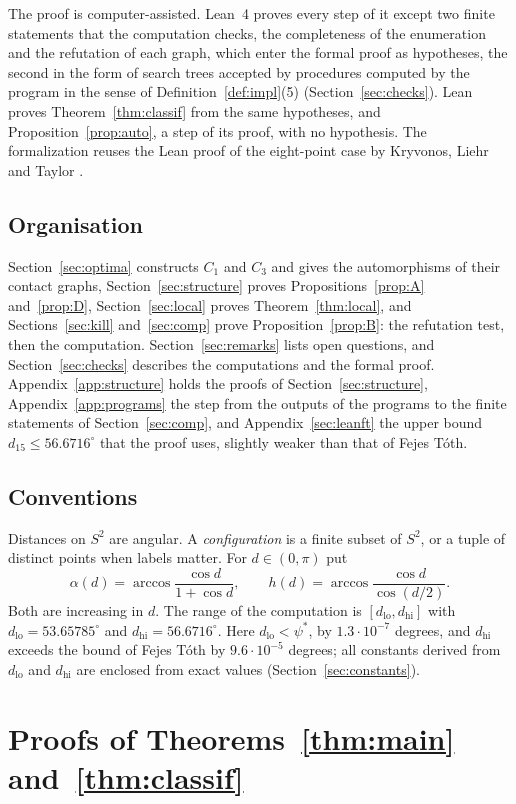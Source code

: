\documentclass[12pt]{amsart}
\theoremstyle{definition}
\theoremstyle{plain}
\theoremstyle{definition}
\newcommand{\Sph}{S^2}
\newcommand{\psis}{\psi^{*}}
\newcommand{\dlo}{d_{\mathrm{lo}}}
\newcommand{\dhi}{d_{\mathrm{hi}}}
\newcommand{\CI}{C_1}
\newcommand{\CIII}{C_3}
\begin{document}
The proof is computer-assisted. Lean~4 proves every step of it except two finite statements that the computation checks, the completeness of the enumeration and the refutation of each graph, which enter the formal proof as hypotheses, the second in the form of search trees accepted by procedures computed by the program in the sense of Definition~\ref{def:impl}(5) (Section~\ref{sec:checks}). Lean proves Theorem~\ref{thm:classif} from the same hypotheses, and Proposition~\ref{prop:auto}, a step of its proof, with no hypothesis. The formalization reuses the Lean proof of the eight-point case by Kryvonos, Liehr and Taylor \cite{KLT}.

\subsection*{Organisation}
Section~\ref{sec:optima} constructs $\CI$ and $\CIII$ and gives the automorphisms of their contact graphs, Section~\ref{sec:structure} proves Propositions~\ref{prop:A} and~\ref{prop:D}, Section~\ref{sec:local} proves Theorem~\ref{thm:local}, and Sections~\ref{sec:kill} and~\ref{sec:comp} prove Proposition~\ref{prop:B}: the refutation test, then the computation. Section~\ref{sec:remarks} lists open questions, and Section~\ref{sec:checks} describes the computations and the formal proof. Appendix~\ref{app:structure} holds the proofs of Section~\ref{sec:structure}, Appendix~\ref{app:programs} the step from the outputs of the programs to the finite statements of Section~\ref{sec:comp}, and Appendix~\ref{sec:leanft} the upper bound $d_{15}\le56.6716^\circ$ that the proof uses, slightly weaker than that of Fejes T\'oth.

\subsection*{Conventions}
Distances on $\Sph$ are angular. A \emph{configuration} is a finite subset of $\Sph$, or a tuple of distinct points when labels matter. For $d\in(0,\pi)$ put
\[
\alpha(d)=\arccos\frac{\cos d}{1+\cos d},\qquad h(d)=\arccos\frac{\cos d}{\cos(d/2)} .
\]
Both are increasing in $d$. The range of the computation is $[\dlo,\dhi]$ with $\dlo=53.65785^\circ$ and $\dhi=56.6716^\circ$. Here $\dlo<\psis$, by $1.3\cdot10^{-7}$ degrees, and $\dhi$ exceeds the bound of Fejes T\'oth by $9.6\cdot10^{-5}$ degrees; all constants derived from $\dlo$ and $\dhi$ are enclosed from exact values (Section~\ref{sec:constants}).

\section{Proofs of Theorems~\ref{thm:main} and~\ref{thm:classif}}\label{sec:reduction}
\end{document}
